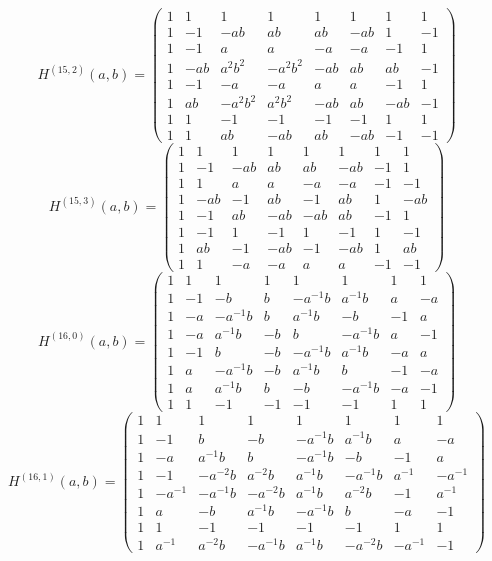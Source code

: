 \documentclass[11pt,a4paper]{article}
\theoremstyle{plain}
\theoremstyle{definition}
\numberwithin{equation}{section}
\begin{document}
\medskip
{\small\setlength{\arraycolsep}{5pt}$$H^{(15,2)}(a,b)=
\begin{pmatrix}
1&1&1&1&1&1&1&1\\1&-1&-ab&ab&ab&-ab&1&-1\\1&-1&a&a&-a&-a&-1&1\\1&-ab&a^{2}b^{2}&-a^{2}b^{2}&-ab&ab&ab&-1\\1&-1&-a&-a&a&a&-1&1\\1&ab&-a^{2}b^{2}&a^{2}b^{2}&-ab&ab&-ab&-1\\1&1&-1&-1&-1&-1&1&1\\1&1&ab&-ab&ab&-ab&-1&-1
\end{pmatrix}$$}
\medskip
{\small\setlength{\arraycolsep}{5pt}$$H^{(15,3)}(a,b)=
\begin{pmatrix}
1&1&1&1&1&1&1&1\\1&-1&-ab&ab&ab&-ab&-1&1\\1&1&a&a&-a&-a&-1&-1\\1&-ab&-1&ab&-1&ab&1&-ab\\1&-1&ab&-ab&-ab&ab&-1&1\\1&-1&1&-1&1&-1&1&-1\\1&ab&-1&-ab&-1&-ab&1&ab\\1&1&-a&-a&a&a&-1&-1
\end{pmatrix}$$}
\medskip
{\small\setlength{\arraycolsep}{5pt}$$H^{(16,0)}(a,b)=
\begin{pmatrix}
1&1&1&1&1&1&1&1\\1&-1&-b&b&-a^{-1}b&a^{-1}b&a&-a\\1&-a&-a^{-1}b&b&a^{-1}b&-b&-1&a\\1&-a&a^{-1}b&-b&b&-a^{-1}b&a&-1\\1&-1&b&-b&-a^{-1}b&a^{-1}b&-a&a\\1&a&-a^{-1}b&-b&a^{-1}b&b&-1&-a\\1&a&a^{-1}b&b&-b&-a^{-1}b&-a&-1\\1&1&-1&-1&-1&-1&1&1
\end{pmatrix}$$}
\medskip
{\small\setlength{\arraycolsep}{5pt}$$H^{(16,1)}(a,b)=
\begin{pmatrix}
1&1&1&1&1&1&1&1\\1&-1&b&-b&-a^{-1}b&a^{-1}b&a&-a\\1&-a&a^{-1}b&b&-a^{-1}b&-b&-1&a\\1&-1&-a^{-2}b&a^{-2}b&a^{-1}b&-a^{-1}b&a^{-1}&-a^{-1}\\1&-a^{-1}&-a^{-1}b&-a^{-2}b&a^{-1}b&a^{-2}b&-1&a^{-1}\\1&a&-b&a^{-1}b&-a^{-1}b&b&-a&-1\\1&1&-1&-1&-1&-1&1&1\\1&a^{-1}&a^{-2}b&-a^{-1}b&a^{-1}b&-a^{-2}b&-a^{-1}&-1
\end{pmatrix}$$}
\end{document}

